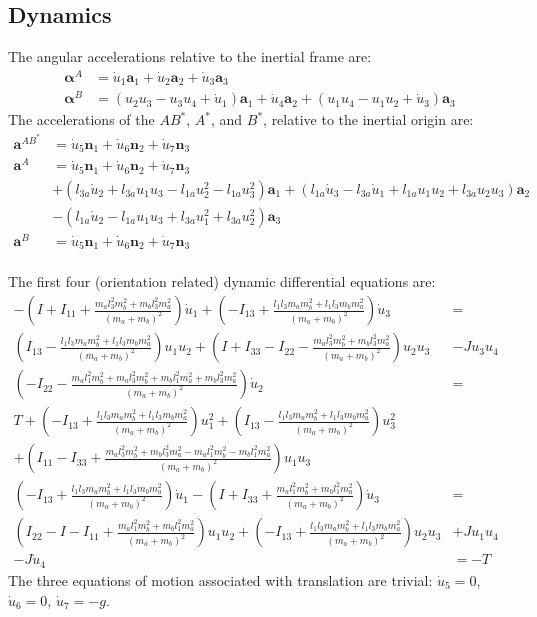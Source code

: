 \documentclass[letterpaper,11pt]{article}
\newcommand{\bs}[1]{ \boldsymbol{ #1 } }
\begin{document}
\subsection*{Dynamics}
The angular accelerations relative to the inertial frame are:
\begin{align*}
  \bs{\alpha}^A & = \dot{u}_1 \bs{a}_1 + \dot{u}_2 \bs{a}_2 + \dot{u}_3 \bs{a}_3\\
  \bs{\alpha}^B & =(u_2u_3 - u_3u_4 + \dot{u}_1)\bs{a}_1 + \dot{u}_4\bs{a}_2 + (u_1u_4 -
  u_1u_2 + \dot{u}_3)\bs{a}_3
\end{align*}
The accelerations of the $AB^*$, $A^*$, and $B^*$, relative to the inertial
origin are:
\begin{align*}
  \bs{a}^{AB^*} &= \dot{u}_5\bs{n}_1 + \dot{u}_6\bs{n}_2 + \dot{u}_7\bs{n}_3 \\
  \bs{a}^A &= \dot{u}_5\bs{n}_1 + \dot{u}_6\bs{n}_2 + \dot{u}_7\bs{n}_3 \\
  & + (l_{3a}\dot{u}_2 + l_{3a}u_1u_3 - l_{1a}u_2^2 - l_{1a}u_3^2)\bs{a}_1
  + (l_{1a}\dot{u}_3 - l_{3a}\dot{u}_1 + l_{1a}u_1u_2 + l_{3a}u_2u_3)\bs{a}_2 \\
  & - (l_{1a}\dot{u}_2 - l_{1a}u_1u_3 + l_{3a}u_1^2 + l_{3a}u_2^2)\bs{a}_3 \\
  \bs{a}^B &= \dot{u}_5\bs{n}_1 + \dot{u}_6\bs{n}_2 + \dot{u}_7\bs{n}_3 \\
\end{align*}


The first four (orientation related) dynamic differential equations are:
\begin{align*}
  -\left(I + I_{11} + \frac{m_al_3^2m_b^2 + m_bl_3^2m_a^2}{(m_a +
  m_b)^2}\right)\dot{u}_{1}
  + \left(-I_{13} + \frac{l_1l_3m_am_b^2 + l_1l_3m_bm_a^2}{(m_a + m_b)^2}\right)\dot{u}_{3}
  & = \\
  \left(I_{13} - \frac{l_1l_3m_am_b^2 + l_1l_3m_bm_a^2}{(m_a + m_b)^2}\right)u_1u_2 +
  \left(I + I_{33} - I_{22} - \frac{m_al_3^2m_b^2 + m_bl_3^2m_a^2}{(m_a +
  m_b)^2}\right)u_2u_3 &- Ju_3u_4 &
  \\
  \left(-I_{22} - \frac{m_al_1^2m_b^2 + m_al_3^2m_b^2 + m_bl_1^2m_a^2 +
  m_bl_3^2m_a^2}{(m_a + m_b)^2}\right) \dot{u}_2
  & = \\
  T + \left(-I_{13} + \frac{l_1l_3m_am_b^2 + l_1l_3m_bm_a^2}{(m_a +
  m_b)^2}\right)u_1^2
  + \left(I_{13} - \frac{l_1l_3m_am_b^2 + l_1l_3m_bm_a^2}{(m_a +
  m_b)^2}\right)u_3^2 &
  \\
  +\left(I_{11} - I_{33} + \frac{m_al_3^2m_b^2 + m_bl_3^2m_a^2 -
  m_al_1^2m_b^2 - m_bl_1^2m_a^2}{(m_a + m_b)^2}\right)u_1u_3 &
  \\
  \left(-I_{13} + \frac{l_1l_3m_am_b^2 + l_1l_3m_bm_a^2}{(m_a + m_b)^2}\right)
  \dot{u}_1 -
  \left(I + I_{33} + \frac{m_al_1^2m_b^2 + m_bl_1^2m_a^2}{(m_a + m_b)^2}
  \right) \dot{u}_3
  & = \\
  \left(I_{22} - I - I_{11} + \frac{m_al_1^2m_b^2 +
  m_bl_1^2m_a^2}{(m_a + m_b)^2}\right)u_1u_2 + \left(-I_{13} + \frac{l_1l_3m_am_b^2 + l_1l_3m_bm_a^2}{(m_a +
  m_b)^2}\right)u_2u_3 &+ Ju_1u_4\\
  -J\dot{u}_4 &=  -T
\end{align*}
The three equations of motion associated with translation are trivial:
$\dot{u}_5 = 0$, $\dot{u}_6 = 0$, $\dot{u}_7 = -g$.
\end{document}
